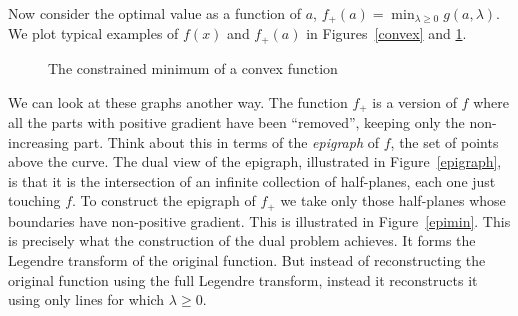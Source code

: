 \documentclass[10pt]{article}
\begin{document}
Now consider the optimal value as a function of $a$, $f_+(a)=\min_{\lambda\ge0}g(a,\lambda)$.
We plot typical examples of $f(x)$ and $f_+(a)$ in Figures~\ref{convex} and \ref{min}.

\begin{figure}
\centering
{}
\caption{The constrained minimum of a convex function}
\label{min}
\end{figure}

We can look at these graphs another way.
The function $f_+$ is a version of $f$ where all the parts with positive gradient have been ``removed'', keeping only the non-increasing part.
Think about this in terms of the {\it epigraph} of $f$, the set of points above the curve.
The dual view of the epigraph, illustrated in Figure~\ref{epigraph}, is that it is the intersection of an infinite collection of half-planes, each one just touching $f$.
To construct the epigraph of $f_+$ we take only those half-planes whose boundaries have non-positive gradient.
This is illustrated in Figure~\ref{epimin}.
This is precisely what the construction of the dual problem achieves.
It forms the Legendre transform of the original function.
But instead of reconstructing the original function using the full Legendre transform, instead it reconstructs it using only lines for which $\lambda\ge0$.
\end{document}
